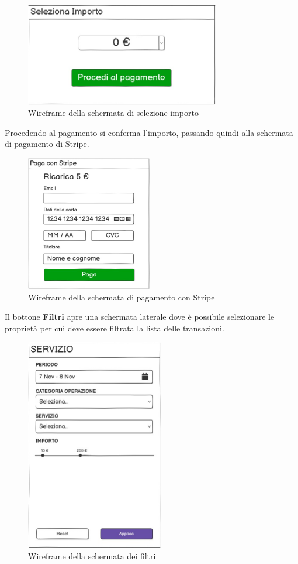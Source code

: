 \begin{figure}[H]
  \centering
  \includegraphics[width=8.5cm]{images/gestione-wallet/mock-seleziona-importo.png}
  \caption{Wireframe della schermata di selezione importo }
\end{figure}
Procedendo al pagamento si conferma l'importo, passando quindi alla schermata di pagamento di Stripe.

\begin{figure}[H]
  \centering
  \includegraphics[width=5.5cm]{images/gestione-wallet/mock-stripe.png}
  \caption{Wireframe della schermata di pagamento con Stripe }
\end{figure}

Il bottone \textbf{Filtri} apre una schermata laterale dove \`e possibile selezionare le propriet\`a per cui deve essere filtrata la lista delle transazioni.

\begin{figure}[H]
  \centering
  \includegraphics[width=6cm]{images/gestione-wallet/mock-filtri-ricerca.png}
  \caption{Wireframe della schermata dei filtri}
\end{figure}

